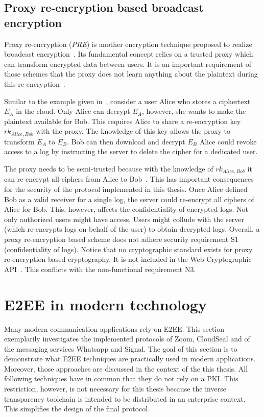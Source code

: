 \documentclass[../main.tex]{subfiles}
\begin{document}
\subsection{Proxy re-encryption based broadcast encryption}
\label{sec:broadcast-proxy}
Proxy re-encryption (\textit{PRE}) is another encryption technique proposed to realize broadcast encryption~\cite{Hagg2022}.
Its fundamental concept relies on a trusted proxy which can transform encrypted data between users.
It is an important requirement of those schemes that the proxy does not learn anything about the plaintext during this re-encryption~\cite{Chen2018}.

Similar to the example given in~\cite{Hagg2022}, consider a user Alice who stores a ciphertext $E_A$ in the cloud.
Only Alice can decrypt $E_A$, however, she wants to make the plaintext available for Bob.
This requires Alice to share a re-encryption key $rk_{Alice,Bob}$ with the proxy.
The knowledge of this key allows the proxy to transform $E_A$ to $E_B$.
Bob can then download and decrypt $E_B$
Alice could revoke access to a log by instructing the server to delete the cipher for a dedicated user.

The proxy needs to be semi-trusted because with the knowledge of $rk_{Alice,Bob}$ it can re-encrypt all ciphers from Alice to Bob~\cite{Chen2018}.
This has important consequences for the security of the protocol implemented in this thesis.
Once Alice defined Bob as a valid receiver for a single log, the server could re-encrypt all ciphers of Alice for Bob.
This, however, affects the confidentiality of encrypted logs.
Not only authorized users might have access.
Users might collude with the server (which re-encrypts logs on behalf of the user) to obtain decrypted logs.
Overall, a proxy re-encryption based scheme does not adhere security requirement S1 (confidentiality of logs).
Notice that no cryptographic standard exists for proxy re-encryption based cryptography.
It is not included in the Web Cryptographic API~\cite{WebCryptoApi2017}.
This conflicts with the non-functional requirement N3.

\section{E2EE in modern technology}

Many modern communication applications rely on E2EE. 
This section exemplarily investigates the implemented protocols of Zoom, CloudSeal and of the messaging services Whatsapp and Signal.
The goal of this section is to demonstrate what E2EE techniques are practically used in modern applications.
Moreover, those approaches are discussed in the context of the this thesis.
All following techniques have in common that they do not rely on a PKI.
This restriction, however, is not necessary for this thesis because the inverse transparency toolchain is intended to be distributed in an enterprise context.
This simplifies the design of the final protocol.
\end{document}
